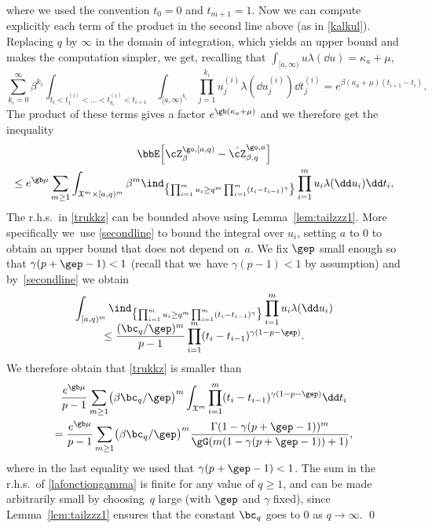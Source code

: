 where we used the convention $t_0=0$ and $t_{m+1}=1$.
Now we can compute explicitly each term of the product in the second line above
(as in \eqref{kalkul}).
Replacing $q$ by $\infty$ in the domain of integration, which yields an upper bound and makes the computation simpler,
we get, recalling that $\int_{[a,\infty)} u\lambda(\dd u) = \kappa_a+\mu$,
\begin{equation*}
\sum_{k_i=0}^\infty \beta^{k_i} \int_{ t_{i}< t^{(i)}_1<\dots<t^{(i)}_{k_i}< t_{i+1} }\int_{[a,\infty)^{k_i}}
\prod_{j=1}^{k_i}
u^{(i)}_j \lambda(\dd u^{(i)}_j) \dd t^{(i)}_j
= e^{ \beta (\kappa_a+\mu) (t_{i+1}-t_i)}.
\end{equation*}
The product of these terms
gives a factor $e^{\gb(\kappa_a+\mu)}$
and we therefore get the inequality
\begin{multline}\label{trukkz}
\bbE\Bigl[ \cZ^{\go,[a,q)}_{\beta} -\hat \cZ^{\go,a}_{\beta,q} \Bigr]\\
\le e^{\gb \mu} \sum_{m\ge 1} \int_{\mathfrak{X}^m\times [a,q)^m}
\beta^{m} \ind_{\bigl\{ \prod_{i=1}^{m} u_{i} \ge q^m \prod_{i=1}^{m} (t_{i}-t_{i-1})^{\gamma}\bigr\}}
\prod_{i=1}^m u_i \lambda(\dd u_i) \dd t_i,
\end{multline}
The r.h.s.\ in \eqref{trukkz} can be bounded above using Lemma~\ref{lem:tailzzz1}. More specifically we~use \eqref{secondline} to bound the integral over $u_i$, setting $a$ to $0$ to obtain an upper bound that does not depend on~$a$. We fix $\gep$ small enough so that $\gamma(p+\gep-1)<1$ (recall that we~have $\gamma(p-1)<1$ by assumption) and by~\eqref{secondline} we obtain
\begin{multline}
\label{avantgamma}
\int_{[a,q)^m} \ind_{\bigl\{ \prod_{i=1}^{m} u_{i} \ge q^m \prod_{i=1}^{m} (t_{i}-t_{i-1})^{\gamma}\bigr\}}
\prod_{i=1}^m u_i \lambda (\dd u_i)\\[-8pt]
\leq \frac{ (\bc_q/\gep)^m}{p-1} \prod_{i=1}^{m} (t_{i}-t_{i-1})^{\gamma(1-p-\gep)}.
\end{multline}
We therefore obtain that \eqref{trukkz} is smaller than
\begin{multline}
\frac{e^{\gb\mu}}{p-1} \sum_{m\ge 1} \bigl(\beta \bc_q/\gep \bigr)^{m}
\int_{\mathfrak{X}^m} \prod_{i=1}^m (t_{i}-t_{i-1})^{\gamma(1-p-\gep)}\dd t_i \\
= \frac{e^{\gb\mu}}{p-1} \sum_{m\ge 1} \bigl(\beta \bc_q/\gep \bigr)^{m} \frac{\Gamma(1-\gamma(p+\gep-1))^m}{ \gG(m(1-\gamma(p+\gep-1))+1)},
\label{lafonctiongamma}
\end{multline}
where in the last equality we used that $\gamma(p+\gep-1)<1$.
The sum in the r.h.s.\ of \eqref{lafonctiongamma} is finite for any value of $q\ge 1$, and can be made arbitrarily small by choosing~$q$ large (with $\gep$ and $\gamma$ fixed),
since Lemma~\ref{lem:tailzzz1} ensures that the constant $\bc_q$
goes to $0$ as $q\to\infty$.
\qed

